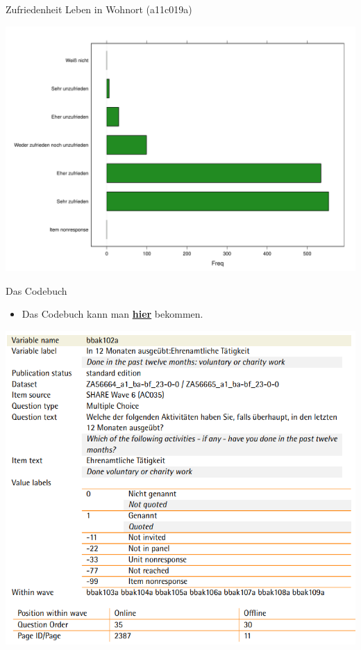 \documentclass[ignorenonframetext,]{beamer}
\providecommand{\tightlist}{%
  \setlength{\itemsep}{0pt}\setlength{\parskip}{0pt}}
\begin{document}
\begin{frame}{Zufriedenheit Leben in Wohnort (a11c019a)}

\includegraphics{GESISPanel_files/figure-beamer/unnamed-chunk-38-1.pdf}

\end{frame}

\begin{frame}{Das Codebuch}

\begin{itemize}
\tightlist
\item
  Das Codebuch kann man
  \href{https://www.gesis.org/gesis-panel/documentation/}{\textbf{hier}}
  bekommen.
\end{itemize}

\includegraphics{figure/cdb_bbak102a.PNG}

\end{frame}
\end{document}
